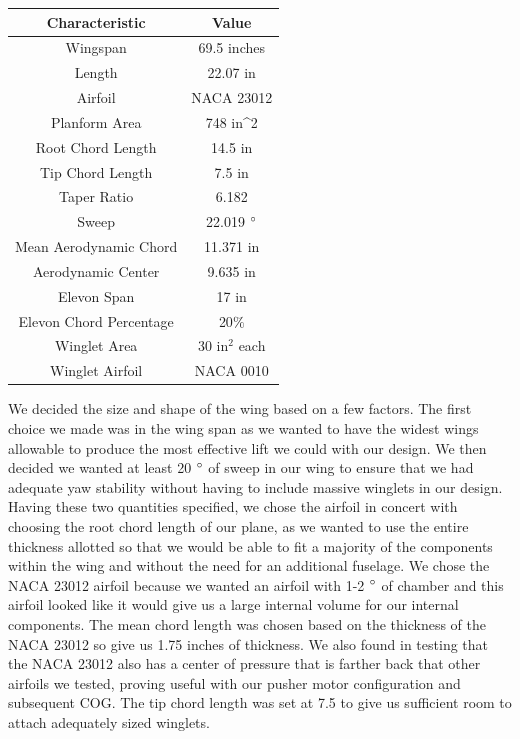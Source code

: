 \begin{center}
\begin{tabular}{c|c} 
 \hline
 Characteristic & Value \\
 \hline\hline
 Wingspan & 69.5 inches\\
 \hline
 Length & 22.07 in\\
 \hline
 Airfoil & NACA 23012\\
 \hline
 Planform Area & 748 in^2\\
 \hline
 Root Chord Length & 14.5 in\\
 \hline
 Tip Chord Length & 7.5 in\\
 \hline
 Taper Ratio & 6.182\\
 \hline
 Sweep & 22.019 $\degree$\\
 \hline
 Mean Aerodynamic Chord &  11.371 in\\
 \hline
 Aerodynamic Center & 9.635 in\\
 \hline
 Elevon Span & 17 in\\
 \hline
 Elevon Chord Percentage & 20$\percent$ \\
 \hline
 Winglet Area & 30 $\text{in}^2$ each\\
 \hline
 Winglet Airfoil & NACA 0010 \\
 \hline
\end{tabular}
\end{center}

We decided the size and shape of the wing based on a few factors. The first choice we made was in the wing span as we wanted to have the widest wings allowable to produce the most effective lift we could with our design. We then decided we wanted at least 20 $\degree$ of sweep in our wing to ensure that we had adequate yaw stability without having to include massive winglets in our design. Having these two quantities specified, we chose the airfoil in concert with choosing the root chord length of our plane, as we wanted to use the entire thickness allotted so that we would be able to fit a majority of the components within the wing and without the need for an additional fuselage. We chose the NACA 23012 airfoil because we wanted an airfoil with 1-2 $\degree$ of chamber and this airfoil looked like it would give us a large internal volume for our internal components. The mean chord length was chosen based on the thickness of the NACA 23012 so give us 1.75 inches of thickness. We also found in testing that the NACA 23012 also has a center of pressure that is farther back that other airfoils we tested, proving useful with our pusher motor configuration and subsequent COG. The tip chord length was set at 7.5 to give us sufficient room to attach adequately sized winglets. \\

